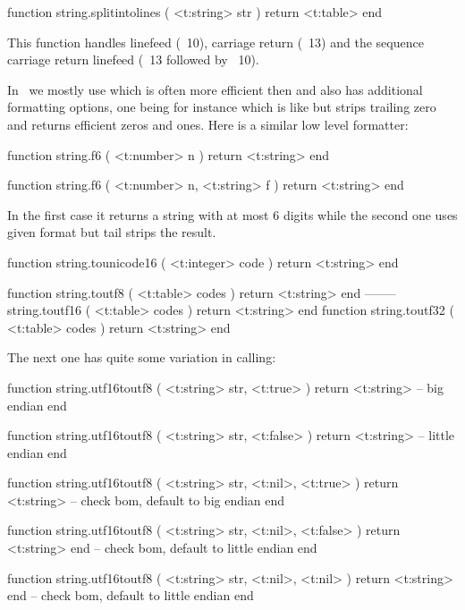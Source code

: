 \starttyping[option=LUA]
function string.splitintolines ( <t:string> str )
    return <t:table>
end
\stoptyping

This function handles linefeed (\ASCII~10), carriage return (\ASCII~13) and the
sequence carriage return linefeed (\ASCII~13 followed by \ASCII~10).

In \CONTEXT\ we mostly use  which is often more
efficient then  and also has additional formatting options,
one being for instance  which is like  but strips trailing zero
and returns efficient zeros and ones. Here is a similar low level formatter:

\starttyping[option=LUA]
function string.f6 ( <t:number> n )
    return <t:string>
end

function string.f6 ( <t:number> n,  <t:string> f )
    return <t:string>
end
\stoptyping

In the first case it returns a string with at most 6 digits while the second one
uses given format but tail strips the result.

\starttyping[option=LUA]
function string.tounicode16 ( <t:integer> code  ) return <t:string> end
\stoptyping

\starttyping[option=LUA]
function string.toutf8  ( <t:table>   codes ) return <t:string> end
-------- string.toutf16 ( <t:table>   codes ) return <t:string> end
function string.toutf32 ( <t:table>   codes ) return <t:string> end
\stoptyping

The next one has quite some variation in calling:

\starttyping[option=LUA]
function string.utf16toutf8 ( <t:string> str, <t:true> )
    return <t:string>  -- big endian
end
\stoptyping

\starttyping[option=LUA]
function string.utf16toutf8 ( <t:string> str, <t:false> )
    return <t:string> -- little endian
end
\stoptyping

\starttyping[option=LUA]
function string.utf16toutf8 ( <t:string> str, <t:nil>, <t:true> )
    return <t:string> -- check bom, default to big endian
end
\stoptyping

\starttyping[option=LUA]
function string.utf16toutf8 ( <t:string> str, <t:nil>, <t:false> )
    return <t:string> end -- check bom, default to little endian
end
\stoptyping

\starttyping[option=LUA]
function string.utf16toutf8 ( <t:string> str, <t:nil>, <t:nil> )
    return <t:string> end -- check bom, default to little endian
end
\stoptyping

